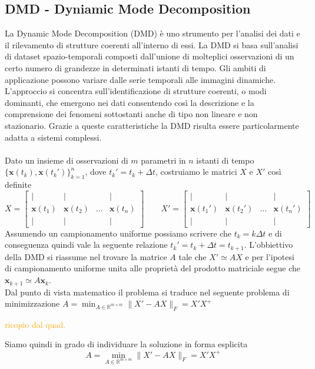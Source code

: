 \documentclass[11pt]{article}
\newcommand{\R}{\mathbb{R}} %
\begin{document}
\subsection{DMD - Dyniamic Mode Decomposition}
La Dynamic Mode Decomposition (DMD) è uno strumento per l'analisi dei dati  e il rilevamento di strutture coerenti all'interno di essi. La DMD si basa sull'analisi di dataset spazio-temporali composti dall'unione di molteplici osservazioni di un certo numero di grandezze in determinati istanti di tempo. Gli ambiti di applicazione possono variare dalle serie temporali alle immagini dinamiche.\\ L'approccio si concentra sull'identificazione di strutture coerenti, o modi dominanti, che emergono nei dati consentendo così la descrizione e la comprensione dei fenomeni sottostanti anche di tipo non lineare e non stazionario. Grazie a queste caratteristiche la DMD risulta essere particolarmente adatta a sistemi complessi.\\
\\
Dato un insieme di osservazioni di $m$ parametri in $n$ istanti di tempo $\{\mathbf{x}(t_k),\mathbf{x}(t_k')\}_{k=1}^n$, dove $t_k'=t_k + \Delta t$,  costruiamo le matrici $X$ e $X'$ così definite
$$ X= \begin{bmatrix}
| & | &  & | \\
\mathbf{x}(t_1) & \mathbf{x}(t_2) & \dots & \mathbf{x}(t_n)\\
| & | & & |
\end{bmatrix} \quad \quad
X'= \begin{bmatrix}
| & | &  & | \\
\mathbf{x}(t_1') & \mathbf{x}(t_2') & \dots & \mathbf{x}(t_n')\\
| & | & & |
\end{bmatrix}
$$
Assumendo un campionamento uniforme possiamo scrivere che $t_k=k\Delta t$ e di conseguenza quindi vale la seguente relazione $t_k'= t_k+\Delta t=t_{k+1}$.
L'obbiettivo della DMD si riassume nel trovare la matrice $A$ tale che $X' \simeq AX$ e per l'ipotesi di campionamento uniforme unita alle proprietà del prodotto matriciale segue che $\mathbf{x}_{k+1} \simeq A\mathbf{x}_k$.\\
Dal punto di vista matematico il problema si traduce nel seguente problema di minimizzazione $ A= \min_{A \in \R^{m \times m}}{\|X' -AX\|_F =X'X^+} $
\begin{center}
\textcolor{orange}{ricopio dal quad.}
\end{center}
Siamo quindi in grado di individuare la soluzione in forma esplicita $$ A= \min_{A \in \R^{m \times m}}{\|X' -AX\|_F =X'X^+} $$
\end{document}
